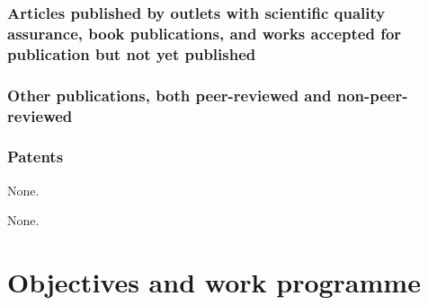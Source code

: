 \documentclass[american,firsttime]{dfgproposal}
\begin{document}
	\newrefcontext%
	\subsubsection{Articles published by outlets with scientific quality assurance, book publications, and works accepted for publication but not yet published}
	\printbibliography[category=reviewed, heading=none, env=bibliographyNUM, resetnumbers]
	
	\subsubsection{Other publications, both peer-reviewed and non-peer-reviewed}
	\printbibliography[category=nonreviewed, heading=none, env=bibliographyNUM]
	
	
	\subsubsection{Patents}
	\printbibliography[category=patents_pending, heading=none]
	None.
	
	\printbibliography[category=patents, heading=none]
	None.
	
	
	\section{Objectives and work programme}
	
\end{document}
